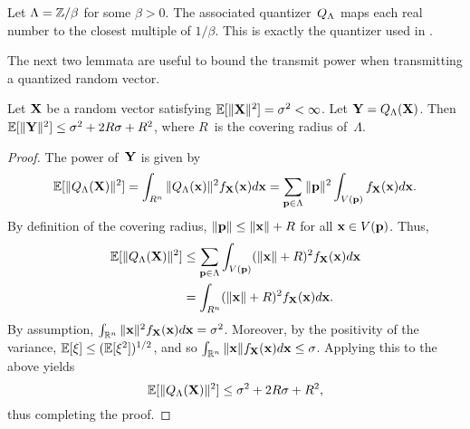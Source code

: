 \begin{subappendices}
  \begin{example}
    Let $\Lambda = \mathbb{Z} / \beta$ for some $\beta >0$. The associated
    quantizer~${Q_{\Lambda}}$ maps each real number to the closest multiple of $1/\beta$.
    This is exactly the quantizer used in .
  \end{example}

  The next two lemmata are useful to bound the transmit power when transmitting
  a quantized random vector.
  \begin{lemma}
    \label{lem:latquantvar}
    Let $\mathbf{X}$ be a random vector satisfying $\mathbb{E}[\|\mathbf{X}\|^2]
    = {\sigma^2} < \infty$. Let $\mathbf{Y} = {Q_{\Lambda}}(\mathbf{X})$. Then $\mathbb{E}[\|\mathbf{Y}\|^2] \le {\sigma^2} + 2R\sigma +
    R^2$, where $R$~is the covering radius of~$\Lambda$.
  \end{lemma}

  \begin{proof}
    The power of~$\mathbf{Y}$ is given by
    \begin{equation*}
      \mathbb{E}[\|{Q_{\Lambda}}(\mathbf{X})\|^2] = \int_{R^n} \|{Q_{\Lambda}}(\mathbf{x})\|^2 f_{\mathbf{X}}(\mathbf{x}) d\mathbf{x}
      = \sum_{\mathbf{p} \in \Lambda} \|\mathbf{p}\|^2 \int_{V(\mathbf{p})} f_{\mathbf{X}}(\mathbf{x}) d\mathbf{x}.
    \end{equation*}
    By definition of the covering radius, $\|\mathbf{p}\| \le \|\mathbf{x}\| + R$ for all $\mathbf{x}
    \in V(\mathbf{p})$. Thus,
    \begin{align*}
      \mathbb{E}[\|{Q_{\Lambda}}(\mathbf{X})\|^2] &\le \sum_{\mathbf{p} \in \Lambda} \int_{V(\mathbf{p})} (\|\mathbf{x}\| + R)^2
      f_{\mathbf{X}}(\mathbf{x}) d\mathbf{x} \\
      &= \int_{R^n} (\|\mathbf{x}\| + R)^2 f_{\mathbf{X}}(\mathbf{x}) d\mathbf{x}.
    \end{align*}
    By assumption, $\int_{\mathbb{R}^n} \|\mathbf{x}\|^2 f_{\mathbf{X}}(\mathbf{x}) d\mathbf{x} = {\sigma^2}$. Moreover, by the
    positivity of the variance, $\mathbb{E}[\xi] \le (\mathbb{E}[\xi^2])^{1/2}$, and so
    $\int_{\mathbb{R}^n} \|\mathbf{x}\| f_{\mathbf{X}}(\mathbf{x}) d\mathbf{x} \le \sigma$. Applying this to the above
    yields
    \begin{equation*}
      \mathbb{E}[\|{Q_{\Lambda}}(\mathbf{X})\|^2] \le {\sigma^2} + 2R\sigma + R^2,
    \end{equation*}
    thus completing the proof.
  \end{proof}


\end{subappendices}
